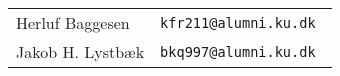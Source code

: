 \clearpage
\maketitle
\vspace{10cm}
\begin{tabular}{l l}
    Herluf Baggesen & \tt{kfr211@alumni.ku.dk} \\
    Jakob H. Lystbæk & \tt{bkq997@alumni.ku.dk}
\end{tabular}
\thispagestyle{empty} %
\begin{bottom}

\end{bottom}
\pagebreak
